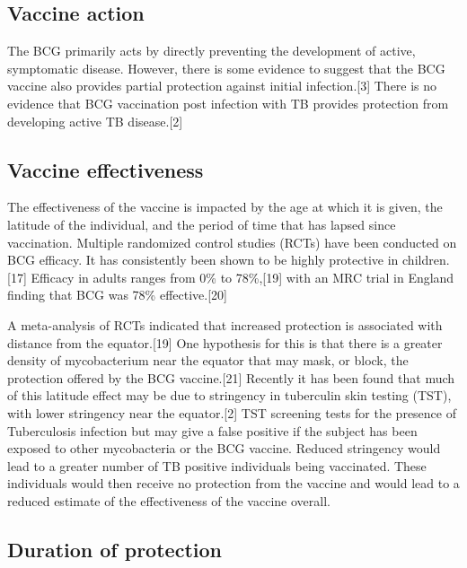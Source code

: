 \documentclass[11pt,twoside]{bristolthesis}
\begin{document}
  \hypertarget{vaccine-action}{%
  \subsection{Vaccine action}\label{vaccine-action}}
  
  The BCG primarily acts by directly preventing the development of active, symptomatic disease. However, there is some evidence to suggest that the BCG vaccine also provides partial protection against initial infection.{[}3{]} There is no evidence that BCG vaccination post infection with TB provides protection from developing active TB disease.{[}2{]}
  
  \hypertarget{vaccine-effectiveness}{%
  \subsection{Vaccine effectiveness}\label{vaccine-effectiveness}}
  
  The effectiveness of the vaccine is impacted by the age at which it is given, the latitude of the individual, and the period of time that has lapsed since vaccination. Multiple randomized control studies (RCTs) have been conducted on BCG efficacy. It has consistently been shown to be highly protective in children.{[}17{]} Efficacy in adults ranges from 0\% to 78\%,{[}19{]} with an MRC trial in England finding that BCG was 78\% effective.{[}20{]}
  
  A meta-analysis of RCTs indicated that increased protection is associated with distance from the equator.{[}19{]} One hypothesis for this is that there is a greater density of mycobacterium near the equator that may mask, or block, the protection offered by the BCG vaccine.{[}21{]} Recently it has been found that much of this latitude effect may be due to stringency in tuberculin skin testing (TST), with lower stringency near the equator.{[}2{]} TST screening tests for the presence of Tuberculosis infection but may give a false positive if the subject has been exposed to other mycobacteria or the BCG vaccine. Reduced stringency would lead to a greater number of TB positive individuals being vaccinated. These individuals would then receive no protection from the vaccine and would lead to a reduced estimate of the effectiveness of the vaccine overall.
  
  \hypertarget{duration-of-protection}{%
  \subsection{Duration of protection}\label{duration-of-protection}}
  
\end{document}
